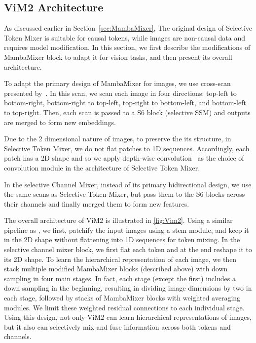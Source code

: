 \documentclass{article}
\newcommand{\head}[1]{\vspace{1.7mm}\noindent{{\textcolor{c1}{\bf #1.}}}}
\begin{document}
\subsection{ViM2 Architecture}
As discussed earlier in Section~\ref{sec:MambaMixer}, The original design of Selective Token Mixer is suitable for causal tokens, while images are non-causal data and requires model modification. In this section, we first describe the modifications of MambaMixer block to adapt it for vision tasks, and then present its overall architecture. 

\head{Scanning}
To adapt the primary design of MambaMixer for images, we use cross-scan presented by~\citet{liu2024vmamba}. In this scan, we scan each image in four directions: top-left to bottom-right, bottom-right to top-left, top-right to bottom-left, and bottom-left to top-right. Then, each scan is passed to a S6 block (selective SSM) and outputs are merged to form new embeddings. 


\head{Depth-wise Convolution}
Due to the 2 dimensional nature of images, to preserve the its structure, in Selective Token Mixer, we do not flat patches to 1D sequences. Accordingly, each patch has a 2D shape and so we apply depth-wise convolution~\citep{guo2019depthwise} as the choice of convolution module in the architecture of Selective Token Mixer. 



\head{Selective Channel Mixing}
In the selective Channel Mixer, instead of its primary bidirectional design, we use the same scans as Selective Token Mixer, but pass them to the S6 blocks across their channels and finally merged them to form new features.  




\head{Overall Architecture}
The overall architecture of ViM2 is illustrated in \autoref{fig:Vim2}. Using a similar pipeline as \citet{liu2024vmamba}, we first, patchify the input images using a stem module, and keep it in the 2D shape without flattening into 1D sequences for token mixing. In the selective channel mixer block, we first flat each token and at the end reshape it to its 2D shape. To learn the hierarchical representation of each image, we then stack multiple modified MambaMixer blocks (described above) with down sampling in four main stages. In fact, each stage (except the first) includes a down sampling in the beginning, resulting in dividing image dimensions by two in each stage, followed by stacks of MambaMixer blocks with weighted averaging modules. We limit these weighted residual connections to each individual stage. Using this design, not only ViM2 can learn hierarchical representations of images, but it also can selectively mix and fuse information across both tokens and channels.
\end{document}
